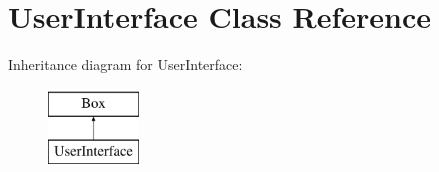 \hypertarget{classUserInterface}{}\section{User\+Interface Class Reference}
\label{classUserInterface}
Inheritance diagram for User\+Interface\+:\begin{figure}[H]
\begin{center}
\leavevmode
\includegraphics[height=2.000000cm]{classUserInterface}
\end{center}
\end{figure}
